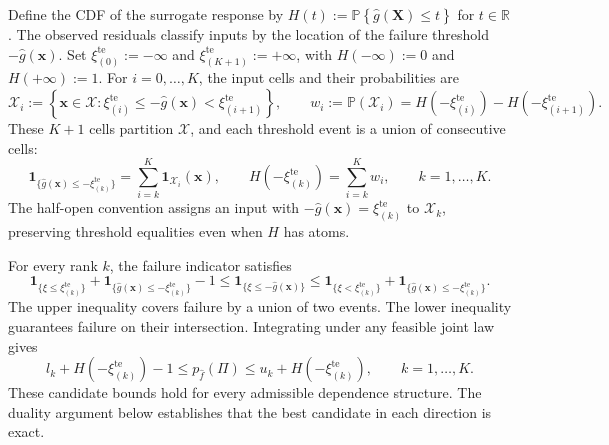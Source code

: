 \documentclass[review,11pt,3p,authoryear,nopreprintline]{elsarticle}
\begin{document}
Define the CDF of the surrogate response by $H(t):=\mathbb P\left\{\hat g(\bm X)\le t\right\}$ for $t\in\mathbb R$. The observed residuals classify inputs by the location of the failure threshold $-\hat g(\bm x)$. Set $\xi_{(0)}^{\mathrm{te}}:=-\infty$ and $\xi_{(K+1)}^{\mathrm{te}}:=+\infty$, with $H(-\infty):=0$ and $H(+\infty):=1$. For $i=0,\ldots,K$, the input cells and their probabilities are
\[
  \mathcal X_i:=\left\{\bm x\in\mathcal X:
    \xi_{(i)}^{\mathrm{te}}\le-\hat g(\bm x)<\xi_{(i+1)}^{\mathrm{te}}\right\},
  \qquad
  w_i:=\mathbb P(\mathcal X_i)
    =H\left(-\xi_{(i)}^{\mathrm{te}}\right)-H\left(-\xi_{(i+1)}^{\mathrm{te}}\right).
\]
These $K+1$ cells partition $\mathcal X$, and each threshold event is a union of consecutive cells:
\[
  \mathbf1_{\{\hat g(\bm x)\le-\xi_{(k)}^{\mathrm{te}}\}}
    =\sum_{i=k}^K\mathbf1_{\mathcal X_i}(\bm x),
  \qquad
  H\left(-\xi_{(k)}^{\mathrm{te}}\right)=\sum_{i=k}^K w_i,
  \qquad k=1,\ldots,K.
\]
The half-open convention assigns an input with $-\hat g(\bm x)=\xi_{(k)}^{\mathrm{te}}$ to $\mathcal X_k$, preserving threshold equalities even when $H$ has atoms.

For every rank $k$, the failure indicator satisfies 
\[
  \mathbf1_{\{\xi\le\xi_{(k)}^{\mathrm{te}}\}}
    +\mathbf1_{\{\hat g(\bm x)\le-\xi_{(k)}^{\mathrm{te}}\}}-1
  \le\mathbf1_{\{\xi\le-\hat g(\bm x)\}}
  \le\mathbf1_{\{\xi<\xi_{(k)}^{\mathrm{te}}\}}
    +\mathbf1_{\{\hat g(\bm x)\le-\xi_{(k)}^{\mathrm{te}}\}}.
\]
The upper inequality covers failure by a union of two events. The lower inequality guarantees failure on their intersection. Integrating under any feasible joint law gives
\begin{equation*}
  l_k+H\left(-\xi_{(k)}^{\mathrm{te}}\right)-1\le p_{\hat f}(\Pi)\le u_k+H\left(-\xi_{(k)}^{\mathrm{te}}\right),
  \qquad k=1,\ldots,K.
\end{equation*}
These candidate bounds hold for every admissible dependence structure. The duality argument below establishes that the best candidate in each direction is exact.
\end{document}
